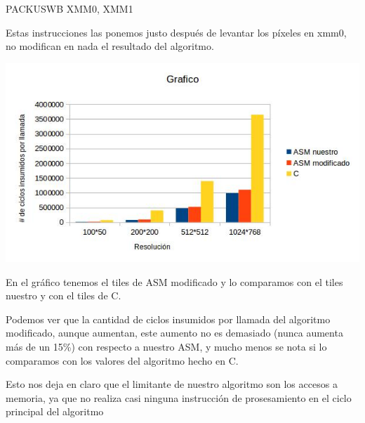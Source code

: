 PACKUSWB XMM0, XMM1
\vspace*{0.3cm} \noindent

Estas instrucciones las ponemos justo después de levantar los píxeles en xmm0, no modifican en 
nada el resultado del algoritmo.\vspace*{0.3cm} \noindent

\begin{center}
 \includegraphics[scale=0.7]{tilesmod.jpg}
\end{center}

En el gráfico tenemos el tiles de ASM modificado y lo comparamos con el tiles nuestro y con el tiles de C.\vspace*{0.3cm} \noindent

Podemos ver que la cantidad de ciclos insumidos por llamada del algoritmo modificado, aunque aumentan, 
este aumento no es demasiado (nunca aumenta más de un 15\%) con respecto a nuestro ASM, y mucho menos se 
nota si lo comparamos con los valores del algoritmo hecho en C. \vspace*{0.3cm} \noindent

Esto nos deja en claro que el limitante de nuestro algoritmo son los accesos a memoria, ya que no realiza 
casi ninguna instrucción de prosesamiento en el ciclo principal del algoritmo \vspace*{0.3cm} \noindent

